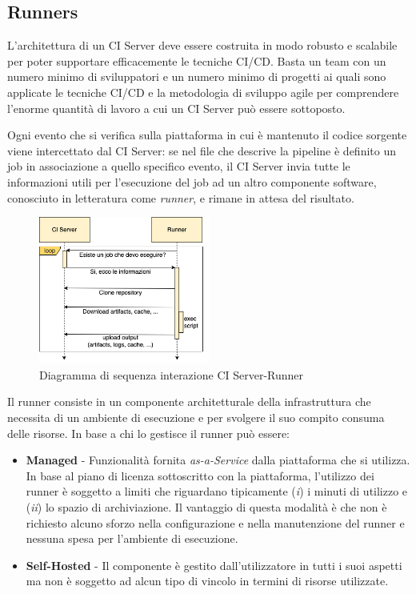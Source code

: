 \subsection{Runners}
L'architettura di un CI Server deve essere costruita in modo robusto e scalabile per poter supportare efficacemente le tecniche CI/CD. Basta un team con un numero minimo di sviluppatori e un numero minimo di progetti ai quali sono applicate le tecniche CI/CD e la metodologia di sviluppo agile per comprendere l'enorme quantità di lavoro a cui un CI Server può essere sottoposto.

Ogni evento che si verifica sulla piattaforma in cui è mantenuto il codice sorgente viene intercettato dal CI Server: se nel file che descrive la pipeline è definito un job in associazione a quello specifico evento, il CI Server invia tutte le informazioni utili per l'esecuzione del job ad un altro componente software, conosciuto in letteratura come \textit{runner}, e rimane in attesa del risultato.

\begin{figure}[H]
    \centering
    \includegraphics[width=0.5\textwidth]{img/ciserver-runner.png}
    \caption{Diagramma di sequenza interazione CI Server-Runner}
    \label{ci-server-runner}
\end{figure}

Il runner consiste in un componente architetturale della infrastruttura che necessita di un ambiente di esecuzione e per svolgere il suo compito consuma delle risorse. In base a chi lo gestisce il runner può essere:

\begin{itemize}
    \item \textbf{Managed} - Funzionalità fornita \textit{as-a-Service} dalla piattaforma che si utilizza. In base al piano di licenza sottoscritto con la piattaforma, l'utilizzo dei runner è soggetto a limiti che riguardano tipicamente (\textit{i}) i minuti di utilizzo e (\textit{ii}) lo spazio di archiviazione. Il vantaggio di questa modalità è che non è richiesto alcuno sforzo nella configurazione e nella manutenzione del runner e nessuna spesa per l'ambiente di esecuzione.
    \item \textbf{Self-Hosted} - Il componente è gestito dall'utilizzatore in tutti i suoi aspetti ma non è soggetto ad alcun tipo di vincolo in termini di risorse utilizzate.
\end{itemize}
